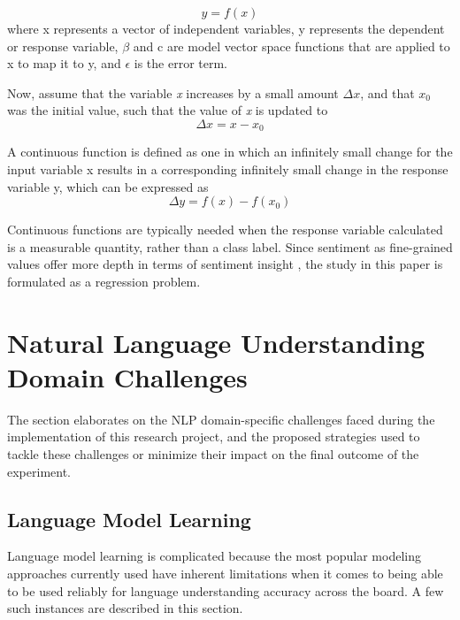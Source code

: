 \documentclass[conference]{IEEEtran}
\begin{document}
        \begin{equation}
            \displaystyle y = f(x)
        \end{equation}
        where x represents a vector of independent variables, y represents the dependent or response variable, $\beta$ and c are model vector space functions that are applied to x to map it to y, and $\epsilon$ is the error term.

        Now, assume that the variable \textit{x} increases by a small amount $\Delta x$, and that $x_0$ was the initial value, such that the value of \textit{x} is updated to
        \begin{equation}
            \displaystyle \Delta x = x - x_0
        \end{equation}

        A continuous function is defined as one in which an infinitely small change for the input variable x results in a corresponding infinitely small change in the response variable y\cite{continuous_function}, which can be expressed as
        \begin{equation}
            \displaystyle \Delta y = f(x) - f(x_0)
        \end{equation}

        Continuous functions are typically needed when the response variable calculated is a measurable quantity, rather than a class label. Since sentiment as fine-grained values offer more depth in terms of sentiment insight \cite{drake2008sentiment}, the study in this paper is formulated as a regression problem.

\vspace{5mm}

\section{Natural Language Understanding Domain Challenges}
    The section elaborates on the NLP domain-specific challenges faced during the implementation of this research project, and the proposed strategies used to tackle these challenges or minimize their impact on the final outcome of the experiment.

    \subsection{Language Model Learning}
        Language model learning is complicated because the most popular modeling approaches currently used have inherent limitations when it comes to being able to be used reliably for language understanding accuracy across the board. A few such instances are described in this section.
        
\end{document}

